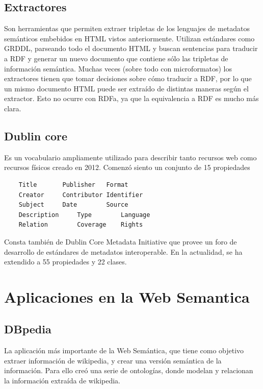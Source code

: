 \subsection{Extractores}

Son herramientas que permiten extraer tripletas de los lenguajes de metadatos semánticos embebidos en HTML vistos anteriormente. 
Utilizan estándares como GRDDL\cite{Connolly2007}, parseando todo el documento HTML y buscan sentencias para traducir a RDF y generar un nuevo documento 
que contiene sólo las tripletas de información semántica. 
Muchas veces (sobre todo con microformatos) los extractores tienen que tomar decisiones sobre cómo traducir a RDF, por lo que 
un mismo documento HTML puede ser extraído de distintas maneras según el extractor. Esto no ocurre con RDFa, ya que la equivalencia a RDF es mucho 
más clara.

\subsection{Dublin core}

\cite{Dublin} Es un vocabulario ampliamente utilizado para describir tanto recursos web como recursos físicos creado en 2012. Comenzó siento un conjunto de 15 
propiedades 

\begin{lstlisting}
    Title		Publisher	Format
    Creator		Contributor	Identifier
    Subject		Date		Source
    Description		Type		Language
    Relation		Coverage	Rights
\end{lstlisting}



Consta también de Dublin Core Metadata Initiative que provee un foro de desarrollo de estándares de metadatos interoperable.
En la actualidad, se ha extendido a 55 propiedades y 22 clases.



\section{Aplicaciones en la Web Semantica}

\subsection{DBpedia}

La aplicación más importante de la Web Semántica, que tiene como objetivo extraer información de wikipedia, y crear una versión semántica 
de la información. Para ello creó una serie de ontologías, donde modelan y relacionan la información extraída de wikipedia.

